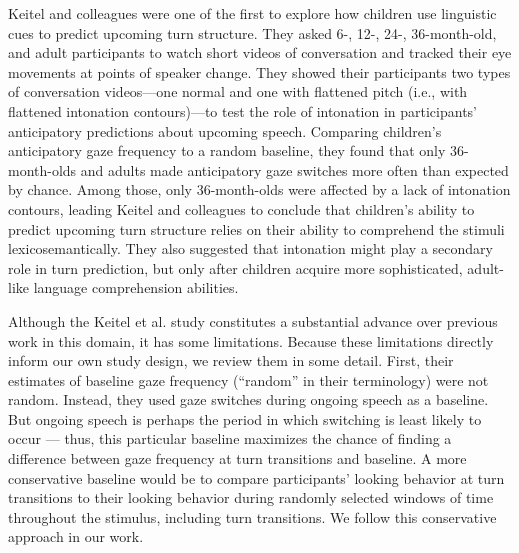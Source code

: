 \documentclass[authoryear, 12pt]{elsarticle}
\begin{document}

Keitel and colleagues \citeyearpar{keitel2013} were one of the first to explore how children use linguistic cues to predict upcoming turn structure. They asked 6-, 12-, 24-, 36-month-old, and adult participants to watch short videos of conversation and tracked their eye movements at points of speaker change. They showed their participants two types of conversation videos---one normal and one with flattened pitch (i.e., with flattened intonation contours)---to test the role of intonation in participants' anticipatory predictions about upcoming speech. Comparing children's anticipatory gaze frequency to a random baseline, they found that only 36-month-olds and adults made anticipatory gaze switches more often than expected by chance. Among those, only 36-month-olds were affected by a lack of intonation contours, leading Keitel and colleagues to conclude that children's ability to predict upcoming turn structure relies on their ability to comprehend the stimuli lexicosemantically. They also suggested that intonation might play a secondary role in turn prediction, but only after children acquire more sophisticated, adult-like language comprehension abilities.

Although the Keitel et al. \citeyearpar{keitel2013} study constitutes a substantial advance over previous work in this domain, it has some limitations. Because these limitations directly inform our own study design, we review them in some detail. First, their estimates of baseline gaze frequency (``random'' in their terminology) were not random. Instead, they used gaze switches during ongoing speech as a baseline. But ongoing speech is perhaps the period in which switching is least likely to occur \citep{hirvenkari2013}--- thus, this particular baseline maximizes the chance of finding a difference between gaze frequency at turn transitions and baseline. A more conservative baseline would be to compare participants' looking behavior at turn transitions to their looking behavior during randomly selected windows of time throughout the stimulus, including turn transitions. We follow this conservative approach in our work. 
\end{document}
